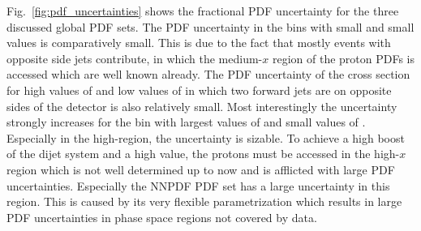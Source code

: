 Fig.~\ref{fig:pdf_uncertainties} shows the fractional PDF uncertainty for the
three discussed global PDF sets. The PDF uncertainty in the bins with small
\ystar and small \yboost values is comparatively small. This is due to the fact
that mostly events with opposite side jets contribute, in which the medium-$x$
region of the proton PDFs is accessed which are well known already. The PDF
uncertainty of the cross section for high values of \ystar and low values of
\yboost in which two forward jets are on opposite sides of the detector is also
relatively small. Most interestingly the uncertainty strongly increases for the
bin with largest values of \yboost and small values of \ystar.  Especially in
the high-\pt region, the uncertainty is sizable. To achieve a high boost of the
dijet system and a high \ptavg value, the protons must be accessed in the
high-$x$ region which is not well determined up to now and is afflicted with
large PDF uncertainties. Especially the NNPDF PDF set has a large uncertainty in
this region. This is caused by its very flexible parametrization which results
in large PDF uncertainties in phase space regions not covered by data.


